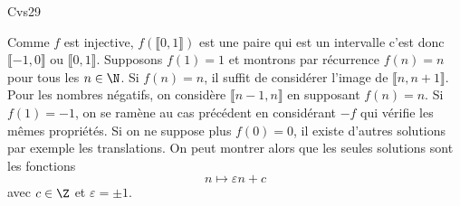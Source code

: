\begin{tiny}Cvs29\end{tiny} Comme $f$ est injective, $f(\llbracket 0,1 \rrbracket)$ est une paire qui est un intervalle c'est donc $\llbracket -1, 0 \rrbracket$ ou $\llbracket 0,1 \rrbracket$.\newline
Supposons  $f(1)= 1$ et montrons par récurrence $f(n)=n$ pour tous les $n\in \N$. Si $f(n)=n$, il suffit de considérer l'image de $\llbracket n, n+1 \rrbracket$.\newline
Pour les nombres négatifs, on considère $\llbracket n-1, n\rrbracket$ en supposant $f(n) = n$.\newline
Si $f(1)=-1$, on se ramène au cas précédent en considérant $-f$ qui vérifie les mêmes propriétés.\newline
Si on ne suppose plus $f(0)=0$, il existe d'autres solutions par exemple les translations. On peut montrer alors que les seules solutions sont les fonctions
\[
  n \mapsto \varepsilon n + c
\]
avec $c\in \Z$ et $\varepsilon = \pm 1$.
